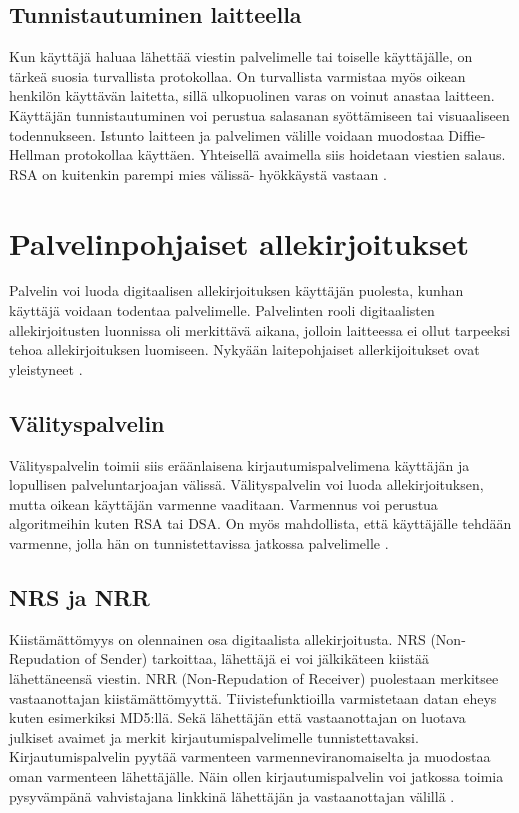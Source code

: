 \documentclass[finnish]{tktltiki2}
\theoremstyle{definition}
\theoremstyle{remark}
\begin{document}
\subsection{Tunnistautuminen laitteella}
Kun käyttäjä haluaa lähettää viestin palvelimelle tai toiselle käyttäjälle, on tärkeä suosia turvallista protokollaa. On turvallista varmistaa myös oikean henkilön käyttävän laitetta, sillä ulkopuolinen varas on voinut anastaa laitteen. Käyttäjän tunnistautuminen voi perustua salasanan syöttämiseen tai visuaaliseen todennukseen. Istunto laitteen ja palvelimen välille voidaan muodostaa Diffie-Hellman protokollaa käyttäen. Yhteisellä avaimella siis hoidetaan viestien salaus. RSA on kuitenkin parempi mies välissä- hyökkäystä vastaan \cite{enti}.

\section{Palvelinpohjaiset allekirjoitukset}

Palvelin voi luoda digitaalisen allekirjoituksen käyttäjän puolesta, kunhan käyttäjä voidaan todentaa palvelimelle. Palvelinten rooli digitaalisten allekirjoitusten luonnissa oli merkittävä aikana, jolloin laitteessa ei ollut tarpeeksi tehoa 
allekirjoituksen luomiseen. Nykyään laitepohjaiset allerkijoitukset ovat yleistyneet \cite{proxy}.

\subsection{Välityspalvelin}

Välityspalvelin toimii siis eräänlaisena kirjautumispalvelimena käyttäjän ja lopullisen palveluntarjoajan välissä. Välityspalvelin voi luoda allekirjoituksen, mutta oikean käyttäjän varmenne vaaditaan. Varmennus voi perustua algoritmeihin kuten RSA tai DSA. On myös mahdollista, että käyttäjälle tehdään varmenne, jolla hän on tunnistettavissa jatkossa palvelimelle \cite{proxy}.

\subsection{NRS ja NRR}

Kiistämättömyys on olennainen osa digitaalista allekirjoitusta. NRS (Non-Repudation of Sender) tarkoittaa, lähettäjä ei voi jälkikäteen kiistää lähettäneensä viestin. NRR (Non-Repudation of Receiver) puolestaan merkitsee vastaanottajan kiistämättömyyttä. Tiivistefunktioilla varmistetaan datan eheys kuten esimerkiksi MD5:llä. Sekä lähettäjän että vastaanottajan on luotava julkiset avaimet ja merkit kirjautumispalvelimelle tunnistettavaksi. Kirjautumispalvelin pyytää varmenteen varmenneviranomaiselta ja muodostaa oman varmenteen lähettäjälle. Näin ollen kirjautumispalvelin voi jatkossa toimia pysyvämpänä vahvistajana linkkinä lähettäjän ja vastaanottajan välillä \cite{gene}.
\end{document}

